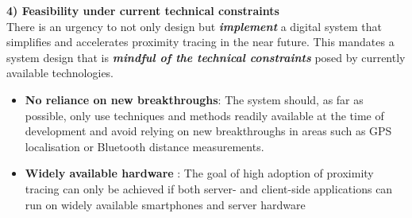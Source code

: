 \documentclass[12pt,a4paper]{article}
\begin{document}
\textbf{4) Feasibility under current technical constraints}\\
There is an urgency to not only design but \textbf{\textit{implement}} a digital system that simplifies and accelerates proximity tracing in the near future. This mandates a system design that is \textbf{\textit{mindful of the technical constraints}}  posed by currently available technologies.
\begin{itemize}\itemsep0pt
\item \textbf{No reliance on new breakthroughs}: The system should, as far as possible, only
use techniques and methods readily available at the time of development and avoid
relying on new breakthroughs in areas such as GPS localisation or Bluetooth
distance measurements.
\item \textbf{Widely available hardware} : The goal of high adoption of proximity tracing can only
be achieved if both server- and client-side applications can run on widely available
smartphones and server hardware
\end{itemize}
\clearpage
\end{document}
